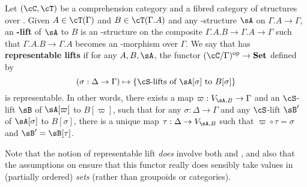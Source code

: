 \documentclass[referee]{psp}
\let\S\cS
\let\C\cC
\let\T\cT
\begin{document}
\begin{defn}\label{defn:replift}
  Let $(\C,\T)$ be a comprehension category and \S a fibred category of structures over \C.
  Given $A\in\T(\Gamma)$ and $B\in\T(\Gamma.A)$ and any \S-structure $\sA$ on $\Gamma.A\to\Gamma$, an \textbf{\S-lift} of $\sA$ to $B$ is an \S-structure on the composite $\Gamma.A.B\to\Gamma.A\to\Gamma$ such that $\Gamma.A.B\to\Gamma.A$ becomes an \S-morphism over $\Gamma$.
  We say that \S has \textbf{representable lifts} if for any $A,B,\sA$, the functor $(\C/\Gamma)\op \to \mathbf{Set}$ defined by
  \begin{equation*}
    (\sigma:\Delta\to\Gamma) \mapsto \{ \text{\S-lifts of $\sA[\sigma]$ to $B[\sigma]$}\}
  \end{equation*}
  is representable.
  In other words, there exists a map $\varpi:V_{\sA,B}\to\Gamma$ and an $\S$-lift $\sB$ of $\sA[\varpi]$ to $B[\varpi]$, such that for any $\sigma:\Delta\to\Gamma$ and any $\S$-lift $\sB'$ of $\sA[\sigma]$ to $B[\sigma]$, there is a unique map $\tau:\Delta\to V_{\sA,B}$ such that $\varpi \circ \tau = \sigma$ and $\sB' = \sB[\tau]$.
\end{defn}

Note that the notion of representable lift \emph{does} involve both \S and \T, and also that the assumptions on \S ensure that this functor really does sensibly take values in (partially ordered) \emph{sets} (rather than groupoids or categories).
\end{document}
